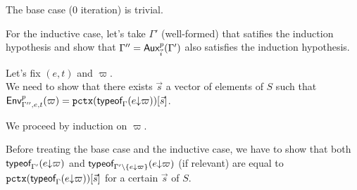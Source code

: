 \documentclass[a4paper]{article}
\theoremstyle{definition}
\begin{document}
    The base case (0 iteration) is trivial.

    For the inductive case, let's take $\Gamma'$ (well-formed) that satifies the induction hypothesis
    and show that $\Gamma'' = \textsf{Aux}^{p}_{\vec {i}}(\Gamma')$ also satisfies the induction hypothesis.

    Let's fix $(e,t)$ and $\varpi$.\\
    We need to show that there exists $\vec s$ a vector of elements of $S$ such that $\textsf{Env}^{p}_{\Gamma'',e,t} (\varpi) = \texttt{pctx}(\textsf{typeof}_{\Gamma}(e{\downarrow}\varpi))[\vec s]$.
    
    We proceed by induction on $\varpi$.

    Before treating the base case and the inductive case, we have to show that both $\textsf{typeof}_{\Gamma'}(e{\downarrow}\varpi)$
    and $\textsf{typeof}_{\Gamma'\setminus\{e{\downarrow}\varpi\}}(e{\downarrow}\varpi)$ (if relevant) are equal to $\texttt{pctx}(\textsf{typeof}_{\Gamma}(e{\downarrow}\varpi))[\vec s]$ for a certain $\vec s$ of $S$.
\end{document}
